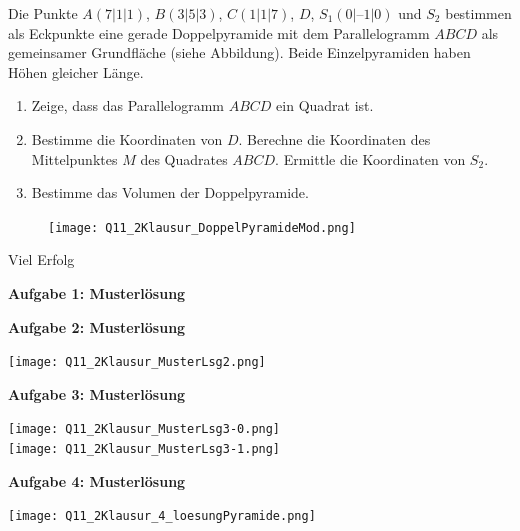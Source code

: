 \documentclass[a4paper,12pt]{article}
\newcommand{\Aufgabe}[1]{
  {
  \vspace*{0.5cm}
  \textsf{\textbf{Aufgabe #1}}
  \vspace*{0.2cm}
  
  }
}
\begin{document}
\begin{minipage}[t]{0.7\textwidth}
Die Punkte $A(7|1|1)$, $B(3|5|3)$, $C(1|1|7)$, $D$, $S_1(0|\text{--}1|0)$ und $S_2$ bestimmen als Eckpunkte eine gerade Doppelpyramide mit dem Parallelogramm $ABCD$ als gemeinsamer Grundfläche (siehe Abbildung). Beide Einzelpyramiden haben Höhen gleicher Länge.

\begin{enumerate}[label={\alph*)}]
  \item Zeige, dass das Parallelogramm $ABCD$ ein Quadrat ist.
  \item Bestimme die Koordinaten von $D$. Berechne die Koordinaten des Mittelpunktes $M$ des Quadrates $ABCD$. Ermittle die Koordinaten von $S_2$.
  \item Bestimme das Volumen der Doppelpyramide.

\end{enumerate}
\end{minipage}
\hspace*{0.75cm}
\begin{minipage}[t]{0.35\textwidth}
  \begin{figure}[H]
    \vspace{-1cm}
    \centering
    \texttt{[image: Q11\_2Klausur\_DoppelPyramideMod.png]}
  \end{figure}
\end{minipage}





\vspace{2.5cm}
\centerline{Viel Erfolg \faThumbsOUp }





\newpage
\Aufgabe{1: Musterlösung}

\Aufgabe{2: Musterlösung}
\texttt{[image: Q11\_2Klausur\_MusterLsg2.png]}

\newpage
\Aufgabe{3: Musterlösung}
\texttt{[image: Q11\_2Klausur\_MusterLsg3-0.png]}
\\
\texttt{[image: Q11\_2Klausur\_MusterLsg3-1.png]}

\newpage
\Aufgabe{4: Musterlösung}
\texttt{[image: Q11\_2Klausur\_4\_loesungPyramide.png]}
\end{document}
